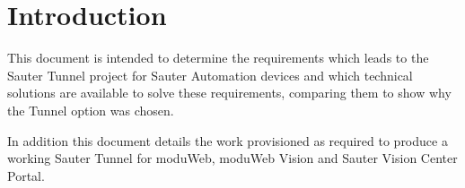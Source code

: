 \chapter{Introduction}
This document is intended to determine the requirements which leads to the Sauter Tunnel project for Sauter Automation devices and which technical solutions are available to solve these requirements, comparing them to show why the Tunnel option was chosen.

In addition this document details the work provisioned as required to produce a working Sauter Tunnel for moduWeb, moduWeb Vision and Sauter Vision Center Portal.
